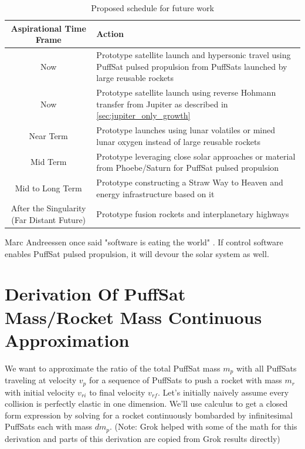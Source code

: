 \documentclass{article}
\begin{document}
\begin{table}[htpb]
    \centering
    \begin{tabularx}{\textwidth}{|c|L|}\hline
        \textbf{Aspirational Time Frame} & \textbf{Action} \\\hline
        Now & Prototype satellite launch and hypersonic travel using PuffSat pulsed propulsion from PuffSats launched by large reusable rockets\\\hline
        Now & Prototype satellite launch using reverse Hohmann transfer from Jupiter as described in \autoref{sec:jupiter_only_growth} \\\hline
        Near Term & Prototype launches using lunar volatiles or mined lunar oxygen instead of large reusable rockets \\\hline
        Mid Term & Prototype leveraging close solar approaches or material from Phoebe/Saturn for PuffSat  pulsed propulsion \\\hline
        Mid to Long Term & Prototype constructing a Straw Way to Heaven and energy infrastructure based on it \\\hline
        After the Singularity (Far Distant Future) & Prototype fusion rockets and interplanetary highways \\\hline
    \end{tabularx}
    \caption{Proposed schedule for future work}
    \label{tab:schedule_future_work}
\end{table}

Marc Andreessen once said "software is eating the world" \cite{andreessen_software}.   If control software enables PuffSat pulsed propulsion, it will devour the solar system as well.

\appendix 
\section{Derivation Of PuffSat Mass/Rocket Mass Continuous Approximation}\label{sec:PuffSat_ratio_approximation}  We want to approximate the ratio of the total PuffSat mass \(m_p\) with all PuffSats traveling at velocity \(v_p\) for a sequence of PuffSats to push a rocket with mass \(m_r\) with initial velocity \(v_{ri}\) to final velocity \(v_{rf}\).   Let's initially naively assume every collision is perfectly elastic in one dimension.   We'll use calculus to get a  closed form expression by solving for a rocket  continuously bombarded by infinitesimal PuffSats each with mass \(dm_p\).   (Note: Grok \cite{grok}  helped with some of the math for this derivation and parts of this derivation are copied from Grok  results directly)
\end{document}
